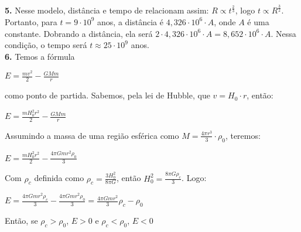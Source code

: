 \documentclass[12pt,letterpaper]{article}
\begin{document}
		\textbf{5.} Nesse modelo, distância e tempo de relacionam assim: $R \propto t^{\frac{2}{3}}$, logo $t \propto R^{\frac{3}{2}}$. Portanto, para $t = 9 \cdot10^9$ anos, a distância é $4,326 \cdot 10^6 \cdot A$, onde $A$ é uma constante. Dobrando a distância, ela será $2 \cdot 4,326 \cdot 10^6 \cdot A = 8,652 \cdot 10^6 \cdot A$. Nessa condição, o tempo será $t \approx 25 \cdot10^9$ anos. \\
				 
		\textbf{6.} Temos a fórmula 
		\begin{center}
			$E = \frac{mv^2}{2}-\frac{GMm}{r}$
		\end{center}
		como ponto de partida. Sabemos, pela lei de Hubble, que $v = H_0\cdot r$, então:
		\begin{center}
			$E = \frac{mH_0^2r^2}{2}-\frac{GMm}{r}$
		\end{center}
		Assumindo a massa de uma região esférica como $M = \frac{4\pi r^3}{3}\cdot \rho_0$, teremos:
		
		\begin{center}
			$E = \frac{mH_0^2r^2}{2}-\frac{4\pi Gmr^2\rho_0}{3}$
		\end{center}
		
		Com $\rho_c$ definida como $\rho_c = \frac{3H_0^2}{8\pi G}$, então $H_0^2 = \frac{8\pi G\rho_c}{3}$. Logo:
		
		\begin{center}
			$E = \frac{4\pi Gmr^2\rho_c}{3}-\frac{4\pi Gmr^2\rho_0}{3} = \frac{4\pi Gmr^2}{3} \rho_c - \rho_0$
		\end{center}
		
		Então, se $\rho_c > \rho_0$, $E > 0$ e $\rho_c < \rho_0$, $E < 0$
		
\end{document}
